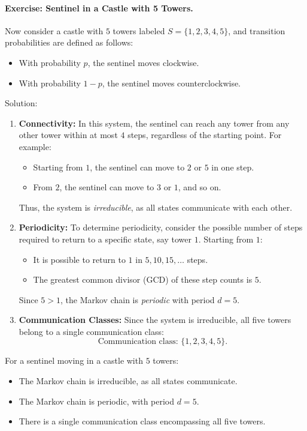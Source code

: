 \paragraph{Exercise: Sentinel in a Castle with 5 Towers.}
Now consider a castle with \( 5 \) towers labeled \( S = \{1, 2, 3, 4, 5\} \), and transition probabilities are defined as follows:
\begin{itemize}
    \item With probability \( p \), the sentinel moves clockwise.
    \item With probability \( 1-p \), the sentinel moves counterclockwise.
\end{itemize}
Solution:
\begin{enumerate}
    \item \textbf{Connectivity:}  
    In this system, the sentinel can reach any tower from any other tower within at most \( 4 \) steps, regardless of the starting point. For example:
    \begin{itemize}
        \item Starting from \( 1 \), the sentinel can move to \( 2 \) or \( 5 \) in one step.
        \item From \( 2 \), the sentinel can move to \( 3 \) or \( 1 \), and so on.
    \end{itemize}
    Thus, the system is \textit{irreducible}, as all states communicate with each other.

    \item \textbf{Periodicity:}  
    To determine periodicity, consider the possible number of steps required to return to a specific state, say tower \( 1 \). Starting from \( 1 \):
    \begin{itemize}
        \item It is possible to return to \( 1 \) in \( 5, 10, 15, \dots \) steps.
        \item The greatest common divisor (GCD) of these step counts is \( 5 \).
    \end{itemize}
    Since \( 5 > 1 \), the Markov chain is \textit{periodic} with period \( d = 5 \).

    \item \textbf{Communication Classes:}  
    Since the system is irreducible, all five towers belong to a single communication class:
    \[
    \text{Communication class: } \{1, 2, 3, 4, 5\}.
    \]
\end{enumerate}
For a sentinel moving in a castle with \( 5 \) towers:
\begin{itemize}
    \item The Markov chain is irreducible, as all states communicate.
    \item The Markov chain is periodic, with period \( d = 5 \).
    \item There is a single communication class encompassing all five towers.
\end{itemize}

